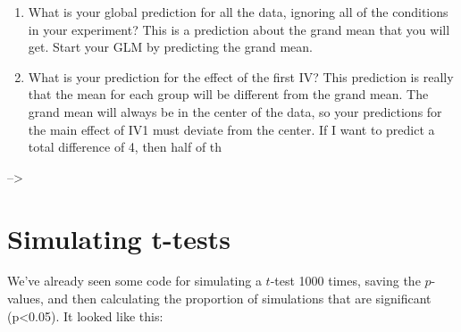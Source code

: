 \documentclass[
]{book}
\newenvironment{Shaded}{\begin{snugshade}}{\end{snugshade}}
\newcommand{\AttributeTok}[1]{\textcolor[rgb]{0.13,0.29,0.53}{#1}}
\newcommand{\ConstantTok}[1]{\textcolor[rgb]{0.56,0.35,0.01}{#1}}
\newcommand{\ControlFlowTok}[1]{\textcolor[rgb]{0.13,0.29,0.53}{\textbf{#1}}}
\newcommand{\DecValTok}[1]{\textcolor[rgb]{0.00,0.00,0.81}{#1}}
\newcommand{\FloatTok}[1]{\textcolor[rgb]{0.00,0.00,0.81}{#1}}
\newcommand{\FunctionTok}[1]{\textcolor[rgb]{0.13,0.29,0.53}{\textbf{#1}}}
\newcommand{\NormalTok}[1]{#1}
\newcommand{\OtherTok}[1]{\textcolor[rgb]{0.56,0.35,0.01}{#1}}
\newcommand{\SpecialCharTok}[1]{\textcolor[rgb]{0.81,0.36,0.00}{\textbf{#1}}}
\begin{document}
\begin{enumerate}
\def\labelenumi{\arabic{enumi}.}
\item
  What is your global prediction for all the data, ignoring all of the conditions in your experiment? This is a prediction about the grand mean that you will get. Start your GLM by predicting the grand mean.
\item
  What is your prediction for the effect of the first IV? This prediction is really that the mean for each group will be different from the grand mean. The grand mean will always be in the center of the data, so your predictions for the main effect of IV1 must deviate from the center. If I want to predict a total difference of 4, then half of th
\end{enumerate}

--\textgreater{}

\section{Simulating t-tests}\label{simulating-t-tests}

We've already seen some code for simulating a \(t\)-test 1000 times, saving the \(p\)-values, and then calculating the proportion of simulations that are significant (p\textless0.05). It looked like this:

\begin{Shaded}
\end{Shaded}
\end{document}
